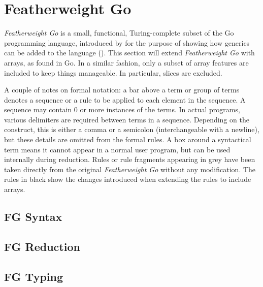 \section{Featherweight Go}

\emph{Featherweight Go} is a small, functional, Turing-complete subset of the Go
programming language, introduced by \citeauthor{fg} for the purpose of showing
how generics can be added to the language (\citeyear{fg}). This section will
extend \emph{Featherweight Go} with arrays, as found in Go. In a similar
fashion, only a subset of array features are included to keep things manageable.
In particular, slices are excluded.

A couple of notes on formal notation: a bar above a term or group of terms
denotes a sequence or a rule to be applied to each element in the sequence. A
sequence may contain 0 or more instances of the terms. In actual programs,
various delimiters are required between terms in a sequence. Depending on the
construct, this is either a comma or a semicolon (interchangeable with a
newline), but these details are omitted from the formal rules. A box around a
syntactical term means it cannot appear in a normal user program, but can be
used internally during reduction. Rules or rule fragments appearing in grey have
been taken directly from the original \emph{Featherweight Go} \autocite{fg}
without any modification. The rules in black show the changes introduced when
extending the rules to include arrays.


\subsection{FG Syntax}



\subsection{FG Reduction}



\subsection{FG Typing}




